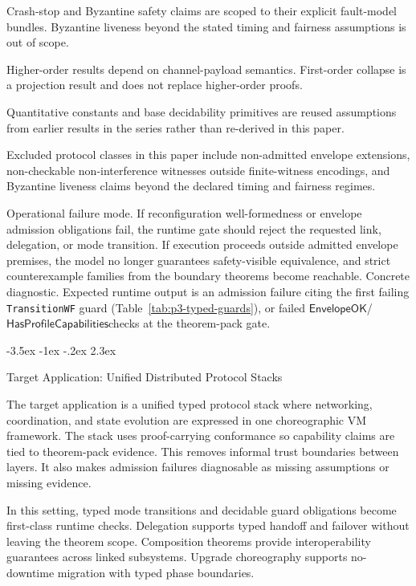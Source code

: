 \documentclass[a4paper,10pt,twocolumn,english]{article}
\makeatletter
\renewcommand{\section}{\@startsection{section}{1}{\z@}%
  {-3.5ex \@plus -1ex \@minus -.2ex}%
  {2.3ex}%
  {\raggedright\normalfont\large\bfseries}}
\numberwithin{equation}{section}
\theoremstyle{paperdef}
\theoremstyle{paperplain}
\theoremstyle{paperdef}
\theoremstyle{paperremark}
\theoremstyle{paperdef}
\newcommand{\EnvelopeOK}{\ensuremath{\mathsf{EnvelopeOK}}}
\newcommand{\HasProfileCapabilities}{\ensuremath{\mathsf{HasProfileCapabilities}}}
\makeatother
\begin{document}
Crash-stop and Byzantine safety claims are scoped to their explicit fault-model bundles. Byzantine liveness beyond the stated timing and fairness assumptions is out of scope.

Higher-order results depend on channel-payload semantics. First-order collapse is a projection result and does not replace higher-order proofs.

Quantitative constants and base decidability primitives are reused assumptions from earlier results in the series rather than re-derived in this paper.

Excluded protocol classes in this paper include non-admitted envelope
extensions, non-checkable non-interference witnesses outside finite-witness
encodings, and Byzantine liveness claims beyond the declared timing and
fairness regimes.

Operational failure mode. If reconfiguration well-formedness or envelope
admission obligations fail, the runtime gate should reject the requested link,
delegation, or mode transition. If execution proceeds outside admitted envelope
premises, the model no longer guarantees safety-visible equivalence, and strict
counterexample families from the boundary theorems become reachable.
Concrete diagnostic. Expected runtime output is an admission failure citing the
first failing \texttt{TransitionWF} guard (Table~\ref{tab:p3-typed-guards}),
or failed \EnvelopeOK/\HasProfileCapabilities checks at the theorem-pack gate.

\section{Target Application: Unified Distributed Protocol Stacks}
\label{sec:application}

The target application is a unified typed protocol stack where networking, coordination, and state evolution are expressed in one choreographic VM framework. The stack uses proof-carrying conformance so capability claims are tied to theorem-pack evidence. This removes informal trust boundaries between layers. It also makes admission failures diagnosable as missing assumptions or missing evidence.

In this setting, typed mode transitions and decidable guard obligations become first-class runtime checks. Delegation supports typed handoff and failover without leaving the theorem scope. Composition theorems provide interoperability guarantees across linked subsystems. Upgrade choreography supports no-downtime migration with typed phase boundaries.
\end{document}
